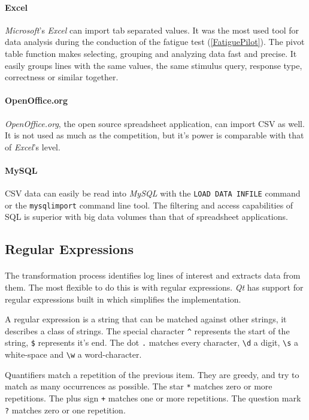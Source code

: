 \paragraph{Excel}
\textit{Microsoft}'s \textit{Excel} can import tab separated values.
It was the most used tool for data analysis during the conduction of the fatigue test (\ref{FatiguePilot}).
The pivot table function makes selecting, grouping and analyzing data fast and precise.
It easily groups lines with the same values, the same stimulus query, response type, correctness or similar together.

\paragraph{OpenOffice.org}
\textit{OpenOffice.org}, the open source spreadsheet application, can import CSV as well.
It is not used as much as the competition, but it's power is comparable with that of \textit{Excel}'s level.

\paragraph{MySQL}
CSV data can easily be read into \textit{MySQL} with the \texttt{LOAD DATA INFILE} command or the \texttt{mysqlimport} command line tool.
The filtering and access capabilities of SQL is superior with big data volumes than that of spreadsheet applications.


\subsection{Regular Expressions}
\paragraph{}
The transformation process identifies log lines of interest and extracts data from them.
The most flexible to do this is with regular expressions.
\textit{Qt} has support for regular expressions built in which simplifies the implementation.

A regular expression is a string that can be matched against other strings, it describes a class of strings.
The special character \texttt{\^} represents the start of the string, \texttt{\$} represents it's end.
The dot \texttt{.} matches every character, \texttt{\textbackslash d} a digit, \texttt{\textbackslash s} a white-space and \texttt{\textbackslash w} a word-character.

Quantifiers match a repetition of the previous item.
They are greedy, and try to match as many occurrences as possible.
The star \texttt{*} matches zero or more repetitions.
The plus sign \texttt{+} matches one or more repetitions.
The question mark \texttt{?} matches zero or one repetition.

